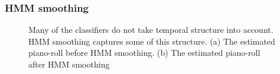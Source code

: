 \documentclass[5p]{elsarticle}
\begin{document}
\subsubsection{HMM smoothing}
\begin{figure}[t]
\begin{center}
\end{center}
\caption{ Many of the classifiers do not take temporal structure into account.  HMM smoothing captures some of this structure.  (a)  The estimated piano-roll before HMM smoothing. (b)  The estimated piano-roll after HMM smoothing}
\end{figure}
\end{document}
